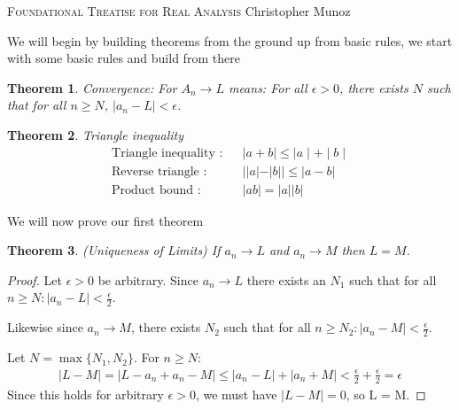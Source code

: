 \documentclass[12pt]{article}
\newtheorem{theorem}{Theorem}[section]
\newcommand{\eps}{\ensuremath{\epsilon}}
\begin{document}
\small
\noindent \textsc{Foundational Treatise for Real Analysis} \hfill Christopher Munoz

\normalsize
\bigskip
We will begin by building theorems from the ground up from basic rules, we start with some basic rules and build from there

\begin{theorem} Convergence: For $A_n \to L$ means: For all $\eps > 0$, there exists $N$ such that for all $n \geq N$, $\mid a_n - L\mid < \eps$.
\end{theorem}

\begin{theorem} Triangle inequality
  \begin{align*}
    \text{Triangle inequality :} && \mid a + b \mid \leq \mid a \mid + \mid b \mid \\
    \text{Reverse triangle :} && ||a| - |b|| \leq |a - b| \\
    \text{Product bound :} && |ab| = |a||b|
  \end{align*}
\end{theorem}
We will now prove our first theorem

\begin{theorem} (Uniqueness of Limits) If $a_n \to L$ and $a_n \to M$ then $L = M$.
\end{theorem}
\begin{proof}
  Let $\eps > 0$ be arbitrary. Since $a_n \to L$ there exists an $N_1$ such that for all $n \geq N : |a_n -L| < \frac{\eps}{2}$.
  
  Likewise since $a_n \to M$, there exists $N_2$ such that for all $n \geq N_2: |a_n - M| < \frac{\eps}{2}$. 

  Let $N = \max\{N_1,N_2\}$. For $n \geq N$:
  \begin{align*}
    |L - M| = |L - a_n + a_n - M| \leq |a_n - L| + |a_n + M| < \frac{\eps}{2} + \frac{\eps}{2} = \eps
  \end{align*}
  Since this holds for arbitrary $\eps > 0$, we must have $|L - M| = 0$, so L = M.

\end{proof}
\end{document}
